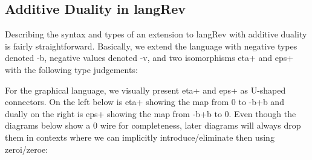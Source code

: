 \documentclass[preprint]{sigplanconf}
\begin{document}
\subsection{Additive Duality in {{langRev}} }
\label{sec:neg}

Describing the syntax and types of an extension to {{langRev}} with additive
duality is fairly straightforward. Basically, we extend the language with
negative types denoted {{-b}}, negative values denoted {{-v}}, and two
isomorphisms {{eta+}} and {{eps+}} with the following type judgements:

%

\vspace{-15pt}
\begin{multicols}{2}  

\end{multicols}



For the graphical language, we visually present {{eta+}} and {{eps+}} as
U-shaped connectors. On the left below is {{eta+}} showing the map from {{0}}
to {{-b+b}} and dually on the right is {{eps+}} showing the map from {{-b+b}}
to 0. Even though the diagrams below show a {{0}} wire for completeness,
later diagrams will always drop them in contexts where we can implicitly
introduce/eliminate then using {{zeroi}}/{{zeroe}}:
\begin{multicols}{2}
\begin{center}
\end{center}
  
\begin{center}
\end{center}
\end{multicols}
\end{document}
